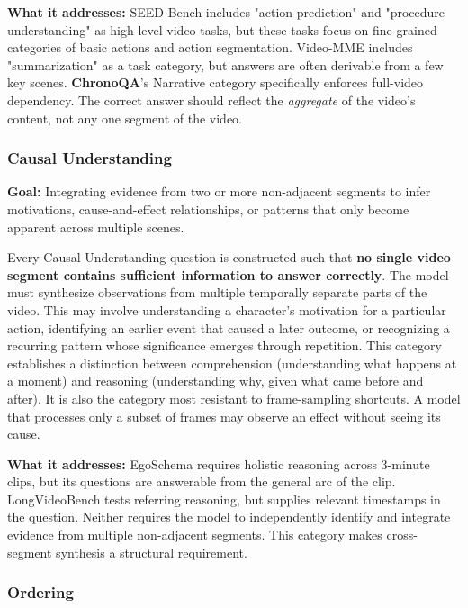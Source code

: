 \documentclass[sigconf,natbib=false,nonacm]{acmart}
\begin{document}
\textbf{What it addresses:} SEED-Bench includes "action prediction" and "procedure understanding" as high-level video tasks, but these tasks focus on fine-grained categories of basic actions and action segmentation. Video-MME \cite{videomme} includes "summarization" as a task category, but answers are often derivable from a few key scenes. \textbf{ChronoQA}'s Narrative category specifically enforces full-video dependency. The correct answer should reflect the \emph{aggregate} of the video's content, not any one segment of the video.


\subsubsection{Causal Understanding}

\textbf{Goal:} Integrating evidence from two or more non-adjacent segments to infer motivations, cause-and-effect relationships, or patterns that only become apparent across multiple scenes. 

Every Causal Understanding question is constructed such that \textbf{no single video segment contains sufficient information to answer correctly}. The model must synthesize observations from multiple temporally separate parts of the video. This may involve understanding a character's motivation for a particular action, identifying an earlier event that caused a later outcome, or recognizing a recurring pattern whose significance emerges through repetition. This category establishes a distinction between comprehension (understanding what happens at a moment) and reasoning (understanding why, given what came before and after). It is also the category most resistant to frame-sampling shortcuts. A model that processes only a subset of frames may observe an effect without seeing its cause.

\textbf{What it addresses:} EgoSchema \cite{egoschema} requires holistic reasoning across 3-minute clips, but its questions are answerable from the general arc of the clip. LongVideoBench \cite{lvbench} tests referring reasoning, but supplies relevant timestamps in the question. Neither requires the model to independently identify and integrate evidence from multiple non-adjacent segments. This category makes cross-segment synthesis a structural requirement.

\subsubsection{Ordering}
\end{document}
